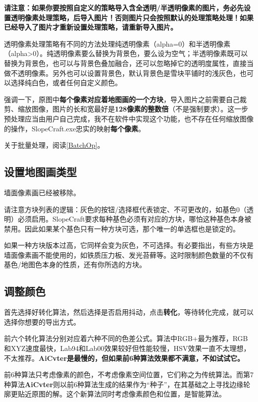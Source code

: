 \documentclass[UTF8]{ctexart}
\begin{document}
\textbf{请注意：如果你要按照自定义的策略导入含全透明/半透明像素的图片，务必先设置透明像素处理策略，后导入图片！否则图片只会按照默认的处理策略处理！如果已经导入了图片才重新设置处理策略，请重新导入图片。}

透明像素处理策略有不同的方法处理纯透明像素（alpha=0）和半透明像素（alpha>0）。纯透明像素要么替换为背景色，要么设为空气；半透明像素既可以替换为背景色，也可以与背景色叠加融合，还可以忽略掉它的透明度属性，直接当做不透明像素。另外也可以设置背景色，默认背景色是雪块平铺时的浅灰色，也可以选择纯白色，或者任何自定义颜色。

强调一下，原图中\textbf{每个像素对应着地图画的一个方块}，导入图片之前需要自己裁剪、缩放图像，图片的长和宽最好是\textbf{128像素的整数倍}（不是强制要求）。这一步预处理应当由用户自己完成，我不在软件中实现这个功能，也不存在任何缩放图像的操作，SlopeCraft.exe忠实的映射\textbf{每个像素}。

关于批量处理，阅读\ref{BatchOp}。

\subsection{设置地图画类型}
墙面像素画已经被移除。

请注意方块列表的逻辑：灰色的按钮/选择框代表锁定、不可更改的，如基色0（透明）必须启用。SlopeCraft要求每种基色必须有对应的方块，哪怕这种基色本身被禁用。因此如果某个基色只有一种方块可选，那个唯一的单选框也是锁定的。

如果一种方块版本过高，它同样会变为灰色，不可选择。有必要指出，有些方块是墙面像素画不能使用的，如铁质压力板、发光苔藓等。这时限制颜色数量的不仅有基色/地图色本身的性质，还有你所选的方块。

\subsection{调整颜色}

首先选择好转化算法，然后选择是否启用抖动，点击\textbf{转化}，等待转化完成，就可以选择你想要的导出方式。

前六个转化算法分别对应着六种不同的色差公式。算法中RGB+最为推荐，RGB和XYZ速度最快，Lab94和Lab00效果较好但性能较慢，HSV效果一直不太理想，不太推荐。\textbf{AiCvter是最慢的，但如果前6种算法效果都不满意，不如试试它。}

前6种算法只考虑像素的颜色，不考虑像素空间位置，它们称之为传统算法。而第7种算法\textbf{AiCvter}则以前6种算法生成的结果作为“种子”，在其基础之上寻找边缘轮廓更贴近原图的解。这个新算法同时考虑像素颜色和位置，是智能算法。
\end{document}
